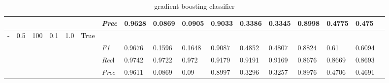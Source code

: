 \begin{table}[]
\begin{tabularx}{\textwidth}{XXXXXX|X|XXX|XXX|XXXX}
    & & & & & & \textit{Prec} & 0.9628 & 0.0869 & 0.0905 & 0.9033 & 0.3386 & 0.3345 & 0.8998 & 0.4775 & 0.475 \\ \midrule
    - & 0.5 & 100 & 0.1 & 1.0 &True & & & & & & & & & \\
    & & & & & & \textit{F1} & 0.9676 & 0.1596 & 0.1648 & 0.9087 & 0.4852        & 0.4807        & 0.8824        & 0.61        & 0.6094        \\
    & & & & & & \textit{Rec}l & 0.9742 & 0.9722 & 0.972    & 0.9179 & 0.9191    & 0.9169    & 0.8676    & 0.8669    & 0.8693    \\
    & & & & & & \textit{Prec} & 0.9611 & 0.0869 & 0.09 & 0.8997 & 0.3296 & 0.3257 & 0.8976 & 0.4706 & 0.4691 \\ \midrule
    \end{tabularx}
    \caption{gradient boosting classifier}
    \label{tab:all_results_gradient_boosting_classifier}
    \end{table}
    
